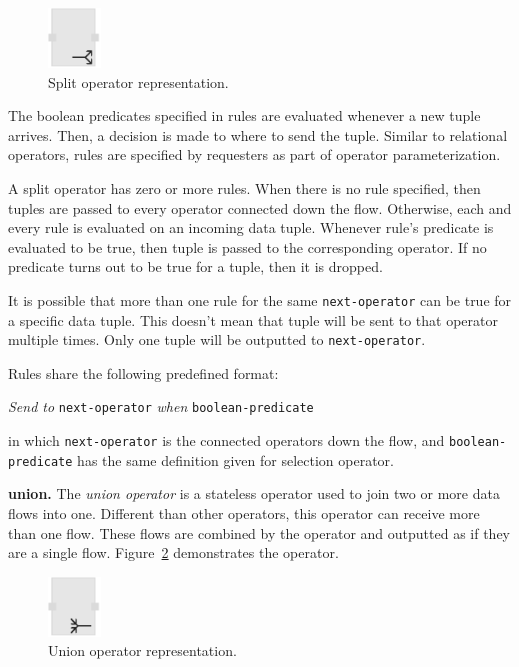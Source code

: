 \begin{figure}[ht]
	\centering
	\includegraphics[height=60px]{figures/SplitOperator.pdf}
	\caption{Split operator representation.}
	\label{fig:split operator}
\end{figure}

The boolean predicates specified in rules are evaluated whenever a new tuple 
arrives. Then, a decision is made to where to send the tuple. Similar to relational 
operators, rules are specified by requesters as part of operator 
parameterization.

A split operator has zero or more rules. When there is no rule specified, then 
tuples are passed to every operator connected down the flow. Otherwise, each 
and every rule is evaluated on an incoming data tuple. Whenever rule's predicate 
is evaluated to be true, then tuple is passed to the corresponding operator. If no 
predicate turns out to be true for a tuple, then it is dropped.

It is possible that more than one rule for the same \texttt{next-operator} can be true 
for a specific data tuple. This doesn't mean that tuple will be sent to that operator 
multiple times. Only one tuple will be outputted to \texttt{next-operator}.

Rules share the following predefined format:

\textit{Send to} \texttt{next-operator} \textit{when} \texttt{boolean-predicate}

in which \texttt{next-operator} is the connected operators down the flow, and 
\texttt{boolean-predicate} has the same definition given for selection operator.

\textbf{union.}
The \textit{union operator} is a stateless operator used to join two or more data flows 
into one. Different than other operators, this operator can receive more than one flow. 
These flows are combined by the operator and outputted as if they are a single flow. 
Figure~\ref{fig:union operator} demonstrates the operator.

\begin{figure}[ht]
	\centering
	\includegraphics[height=60px]{figures/UnionOperator.pdf}
	\caption{Union operator representation.}
	\label{fig:union operator}
\end{figure}

